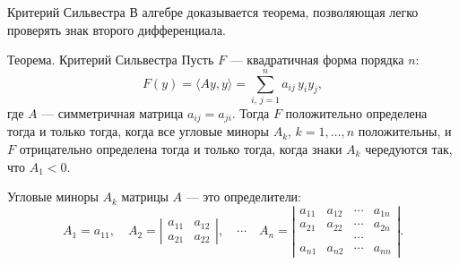\documentclass[8pt]{beamer}
\begin{document}
\begin{frame}{Критерий Сильвестра}
В алгебре доказывается теорема, позволяющая легко проверять знак второго дифференциала.
\begin{block}{Теорема. Критерий Сильвестра}
Пусть $F$ --- квадратичная форма порядка $n$:
$$F(y) = \langle A y, y \rangle = \sum_{i,\, j=1}^n a_{ij}\, y_i y_j,$$
где $A$ --- симметричная матрица $a_{ij} = a_{ji}$. Тогда $F$ положительно определена тогда и только тогда, когда все угловые миноры $A_k$, $k=1,\ldots,n$ положительны, и $F$ отрицательно определена тогда и только тогда, когда знаки $A_k$ чередуются так, что $A_1<0$.
\end{block}
Угловые миноры $A_k$ матрицы $A$ --- это определители:
$$A_1 = a_{11},\quad A_2 = \left| \begin{array}{cc}
a_{11}&a_{12}\\
a_{21}&a_{22}
\end{array}\right|, 
\quad\cdots\quad
A_n = \left|\begin{array}{cccc}
a_{11}&a_{12}&\cdots&a_{1n}\\
a_{21}&a_{22}&\cdots&a_{2n}\\
& & \cdots & \\
a_{n1}&a_{n2}&\cdots&a_{nn}
\end{array}\right|.$$

\end{frame}
\end{document}
